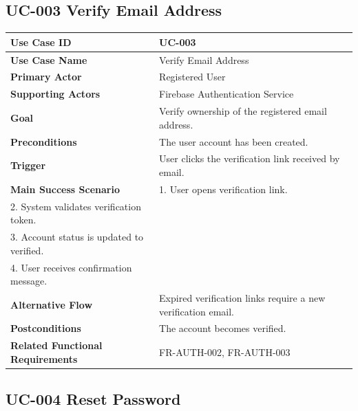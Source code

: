 \subsection{UC-003 Verify Email Address}

\begin{longtable}{|p{4cm}|p{10cm}|}

\hline
\textbf{Use Case ID} &
UC-003 \\
\hline

\textbf{Use Case Name} &
Verify Email Address \\
\hline

\textbf{Primary Actor} &
Registered User \\
\hline

\textbf{Supporting Actors} &
Firebase Authentication Service \\
\hline

\textbf{Goal} &
Verify ownership of the registered email address. \\
\hline

\textbf{Preconditions} &
The user account has been created. \\
\hline

\textbf{Trigger} &
User clicks the verification link received by email. \\
\hline

\textbf{Main Success Scenario} &
1. User opens verification link.\\
2. System validates verification token.\\
3. Account status is updated to verified.\\
4. User receives confirmation message.\\
\hline

\textbf{Alternative Flow} &
Expired verification links require a new verification email. \\
\hline

\textbf{Postconditions} &
The account becomes verified. \\
\hline

\textbf{Related Functional Requirements} &
FR-AUTH-002, FR-AUTH-003 \\
\hline

\end{longtable}

\subsection{UC-004 Reset Password}

